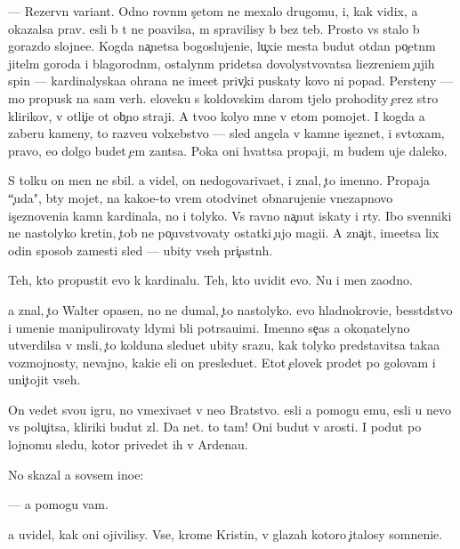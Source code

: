 \documentclass[10pt]{book}
\begin{document}
— Rezervn{\yi}{\y} variant. Odno rovn{\yi}m s{\c}etom ne mexalo drugomu, i, kak vidix, {\y}a okazalsa prav. {\Y}esli b{\yi} t{\yi} ne po{\y}avilsa, m{\yi} spravilisy b{\yi} bez teb{\ia}. Prosto vs{\e} stalo b{\yi} gorazdo slojne{\y}e. Kogda na{\c}netsa bogoslujeni{\y}e, lu{\c}xi{\y}e mesta budut otdan{\yi} po{\c}etn{\yi}m jitel{\ia}m goroda i blagorodn{\yi}m, ostalyn{\yi}m pridetsa dovolystvovatsa li{\q}ezreni{\y}em {\c}ujih spin — kardinalyska{\y}a ohrana ne ime{\y}et priv{\yi}{\c}ki puskaty kovo ni popad{\ia}. Persteny — mo{\y} propusk na sam{\yi}{\y} verh. {\C}eloveku s koldovskim darom t{\ia}jelo prohodity {\c}erez stro{\y} klirikov, v otli{\c}i{\y}e ot ob{\yi}{\c}no{\y} straji. A tvo{\y}o koly{\q}o mne v etom pomojet. I kogda {\y}a zaberu kameny, to razve{\y}u volxebstvo — sled angela v kamne is{\c}eznet, i sv{\ia}toxam, pravo, {\y}e{\x}o dolgo budet {\c}em zan{\ia}tsa. Poka oni hvat{\ia}tsa propaji, m{\yi} budem uje daleko.

S tolku on men{\ia} ne sbil. {\Y}a videl, on nedogovariva{\y}et, i znal, {\c}to imenno. Propaja ``{\c}uda", b{\yi}ty mojet, na kako{\y}e-to vrem{\ia} otodvinet obnarujeni{\y}e vnezapnovo is{\c}eznoveni{\y}a kamn{\ia} kardinala, no i tolyko. Vs{\e} ravno na{\c}nut iskaty i r{\yi}ty. Ibo sv{\ia}{\x}enniki ne nastolyko kretin{\yi}, {\c}tob{\yi} ne po{\c}uvstvovaty ostatki {\c}ujo{\y} magi{\y}i. A zna{\c}it, ime{\y}etsa lix odin sposob zamesti sled{\yi} — ubity vseh pri{\c}astn{\yi}h.

Teh, kto propustit {\y}evo k kardinalu. Teh, kto uvidit {\y}evo. Nu i men{\ia} zaodno.

{\Y}a znal, {\c}to Walter opasen, no ne dumal, {\c}to nastolyko. {\Y}evo hladnokrovi{\y}e, besst{\yi}dstvo i umeni{\y}e manipulirovaty l{\iu}dymi b{\yi}li potr{\ia}sa{\y}u{\x}imi. Imenno se{\y}{\c}as {\y}a okon{\c}atelyno utverdilsa v m{\yi}sli, {\c}to kolduna sledu{\y}et ubity srazu, kak tolyko predstavitsa taka{\y}a vozmojnosty, nevajno, kaki{\y}e {\q}eli on presledu{\y}et. Etot {\c}elovek pro{\y}det po golovam i uni{\c}tojit vseh.

On vedet svo{\y}u igru, no vmexiva{\y}et v ne{\y}o Bratstvo. {\Y}esli {\y}a pomogu {\y}emu, {\y}esli u nevo vs{\e} polu{\c}itsa, kliriki budut zl{\yi}. Da net. {\C}to tam! Oni budut v {\y}arosti. I po{\y}dut po lojnomu sledu, kotor{\yi}{\y} privedet ih v Ardenau.

No skazal {\y}a sovsem ino{\y}e:

— {\Y}a pomogu vam.

{\Y}a uvidel, kak oni ojivilisy. Vse, krome Kristin{\yi}, v glazah kotoro{\y} {\c}italosy somneni{\y}e.
\end{document}
